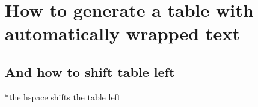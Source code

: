 \section{How to generate a table with automatically wrapped text}
\subsection{And how to shift table left}
*the hspace shifts the table left



